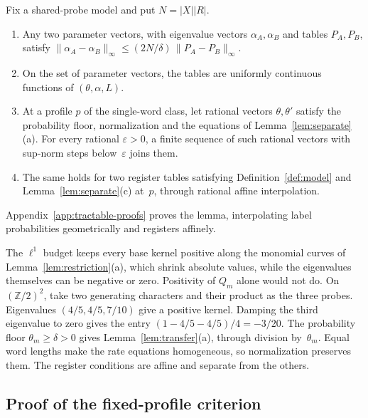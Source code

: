\begin{lemma}\label{lem:transfer}
Fix a shared-probe model and put $N=|X||R|$.
\begin{enumerate}
\item[(a)] Any two parameter vectors, with eigenvalue vectors
$\alpha_A,\alpha_B$ and tables $P_A,P_B$, satisfy
$\|\alpha_A-\alpha_B\|_\infty\le(2N/\delta)\,\|P_A-P_B\|_\infty$.
\item[(b)] On the set of parameter vectors, the tables are uniformly
continuous functions of $(\theta,\alpha,L)$.
\item[(c)] At a profile $p$ of the single-word class, let rational vectors
$\theta,\theta'$ satisfy the probability floor, normalization and the
equations of Lemma~\ref{lem:separate}(a). For every rational
$\varepsilon>0$, a finite sequence of such rational vectors with sup-norm
steps below~$\varepsilon$ joins them.
\item[(d)] The same holds for two register tables satisfying
Definition~\ref{def:model} and Lemma~\ref{lem:separate}(c) at~$p$, through
rational affine interpolation.
\end{enumerate}
\end{lemma}

Appendix~\ref{app:tractable-proofs} proves the lemma, interpolating label
probabilities geometrically and registers affinely.

\begin{remark}\label{rem:restrictions}
The $\ell^1$ budget keeps every base kernel positive along the monomial
curves of Lemma~\ref{lem:restriction}(a), which shrink absolute values,
while the eigenvalues themselves can be negative or zero. Positivity of
$Q_m$ alone would not do. On $(\mathbb Z/2)^2$, take two generating
characters and their product as the three probes. Eigenvalues
$(4/5,4/5,7/10)$ give a positive kernel. Damping the third eigenvalue to
zero gives the entry $(1-4/5-4/5)/4=-3/20$. The probability floor
$\theta_m\ge\delta>0$ gives Lemma~\ref{lem:transfer}(a), through division
by~$\theta_m$. Equal word lengths make the rate equations homogeneous, so
normalization preserves them. The register conditions are affine and
separate from the others.
\end{remark}

\subsection{Proof of the fixed-profile criterion}\label{sec:fixed-proof}

